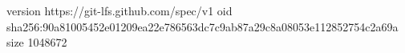 version https://git-lfs.github.com/spec/v1
oid sha256:90a81005452e01209ea22e786563dc7c9ab87a29c8a08053e112852754c2a69a
size 1048672
